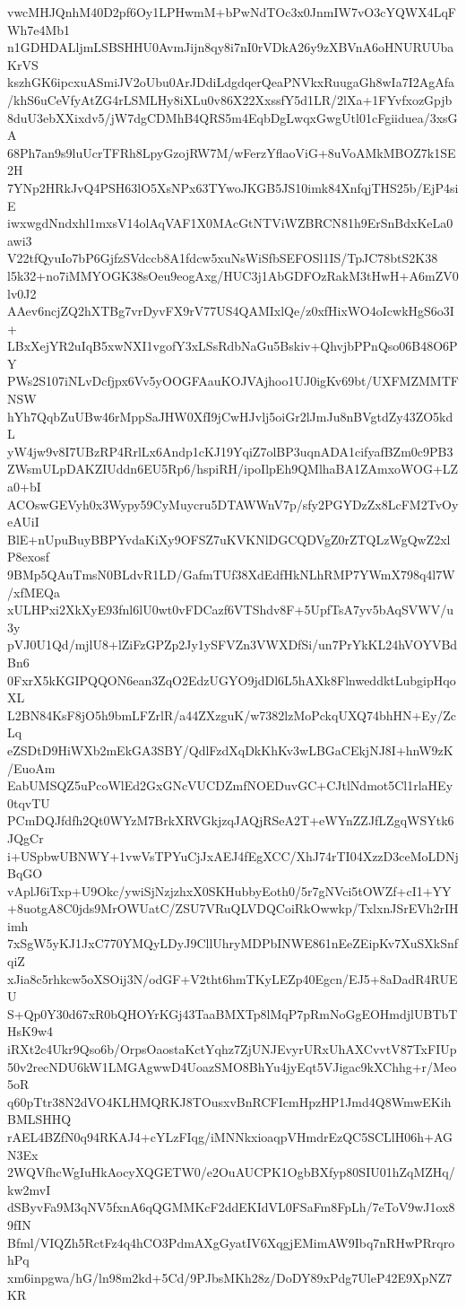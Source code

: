 vwcMHJQnhM40D2pf6Oy1LPHwmM+bPwNdTOc3x0JnmIW7vO3cYQWX4LqFWh7e4Mb1
n1GDHDALljmLSBSHHU0AvmJijn8qy8i7nI0rVDkA26y9zXBVnA6oHNURUUbaKrVS
kszhGK6ipcxuASmiJV2oUbu0ArJDdiLdgdqerQeaPNVkxRuugaGh8wIa7I2AgAfa
/khS6uCeVfyAtZG4rLSMLHy8iXLu0v86X22XxssfY5d1LR/2lXa+1FYvfxozGpjb
8duU3ebXXixdv5/jW7dgCDMhB4QRS5m4EqbDgLwqxGwgUtl01cFgiiduea/3xsGA
68Ph7an9s9luUcrTFRh8LpyGzojRW7M/wFerzYflaoViG+8uVoAMkMBOZ7k1SE2H
7YNp2HRkJvQ4PSH63lO5XsNPx63TYwoJKGB5JS10imk84XnfqjTHS25b/EjP4siE
iwxwgdNndxhl1mxsV14olAqVAF1X0MAcGtNTViWZBRCN81h9ErSnBdxKeLa0awi3
V22tfQyuIo7bP6GjfzSVdccb8A1fdcw5xuNsWiSfbSEFOSl1IS/TpJC78btS2K38
l5k32+no7iMMYOGK38sOeu9eogAxg/HUC3j1AbGDFOzRakM3tHwH+A6mZV0lv0J2
AAev6ncjZQ2hXTBg7vrDyvFX9rV77US4QAMIxlQe/z0xfHixWO4oIcwkHgS6o3I+
LBxXejYR2uIqB5xwNXI1vgofY3xLSsRdbNaGu5Bskiv+QhvjbPPnQso06B48O6PY
PWs2S107iNLvDcfjpx6Vv5yOOGFAauKOJVAjhoo1UJ0igKv69bt/UXFMZMMTFNSW
hYh7QqbZuUBw46rMppSaJHW0XfI9jCwHJvlj5oiGr2lJmJu8nBVgtdZy43ZO5kdL
yW4jw9v8I7UBzRP4RrlLx6Andp1cKJ19YqiZ7olBP3uqnADA1cifyafBZm0c9PB3
ZWsmULpDAKZIUddn6EU5Rp6/hspiRH/ipoIlpEh9QMlhaBA1ZAmxoWOG+LZa0+bI
ACOswGEVyh0x3Wypy59CyMuycru5DTAWWnV7p/sfy2PGYDzZx8LcFM2TvOyeAUiI
BlE+nUpuBuyBBPYvdaKiXy9OFSZ7uKVKNlDGCQDVgZ0rZTQLzWgQwZ2xlP8exosf
9BMp5QAuTmsN0BLdvR1LD/GafmTUf38XdEdfHkNLhRMP7YWmX798q4l7W/xfMEQa
xULHPxi2XkXyE93fnl6lU0wt0vFDCazf6VTShdv8F+5UpfTsA7yv5bAqSVWV/u3y
pVJ0U1Qd/mjlU8+lZiFzGPZp2Jy1ySFVZn3VWXDfSi/un7PrYkKL24hVOYVBdBn6
0FxrX5kKGIPQQON6ean3ZqO2EdzUGYO9jdDl6L5hAXk8FlnweddktLubgipHqoXL
L2BN84KsF8jO5h9bmLFZrlR/a44ZXzguK/w7382lzMoPckqUXQ74bhHN+Ey/ZcLq
eZSDtD9HiWXb2mEkGA3SBY/QdlFzdXqDkKhKv3wLBGaCEkjNJ8I+hnW9zK/EuoAm
EabUMSQZ5uPcoWlEd2GxGNcVUCDZmfNOEDuvGC+CJtlNdmot5Cl1rlaHEy0tqvTU
PCmDQJfdfh2Qt0WYzM7BrkXRVGkjzqJAQjRSeA2T+eWYnZZJfLZgqWSYtk6JQgCr
i+USpbwUBNWY+1vwVsTPYuCjJxAEJ4fEgXCC/XhJ74rTI04XzzD3ceMoLDNjBqGO
vAplJ6iTxp+U9Okc/ywiSjNzjzhxX0SKHubbyEoth0/5r7gNVci5tOWZf+cI1+YY
+8uotgA8C0jds9MrOWUatC/ZSU7VRuQLVDQCoiRkOwwkp/TxlxnJSrEVh2rIHimh
7xSgW5yKJ1JxC770YMQyLDyJ9CllUhryMDPbINWE861nEeZEipKv7XuSXkSnfqiZ
xJia8c5rhkcw5oXSOij3N/odGF+V2tht6hmTKyLEZp40Egcn/EJ5+8aDadR4RUEU
S+Qp0Y30d67xR0bQHOYrKGj43TaaBMXTp8lMqP7pRmNoGgEOHmdjlUBTbTHsK9w4
iRXt2c4Ukr9Qso6b/OrpsOaostaKctYqhz7ZjUNJEvyrURxUhAXCvvtV87TxFIUp
50v2recNDU6kW1LMGAgwwD4UoazSMO8BhYu4jyEqt5VJigac9kXChhg+r/Meo5oR
q60pTtr38N2dVO4KLHMQRKJ8TOusxvBnRCFIcmHpzHP1Jmd4Q8WmwEKihBMLSHHQ
rAEL4BZfN0q94RKAJ4+cYLzFIqg/iMNNkxioaqpVHmdrEzQC5SCLlH06h+AGN3Ex
2WQVfhcWgIuHkAocyXQGETW0/e2OuAUCPK1OgbBXfyp80SIU01hZqMZHq/kw2mvI
dSByvFa9M3qNV5fxnA6qQGMMKcF2ddEKIdVL0FSaFm8FpLh/7eToV9wJ1ox89fIN
Bfml/VIQZh5RctFz4q4hCO3PdmAXgGyatIV6XqgjEMimAW9Ibq7nRHwPRrqrohPq
xm6inpgwa/hG/ln98m2kd+5Cd/9PJbsMKh28z/DoDY89xPdg7UleP42E9XpNZ7KR
